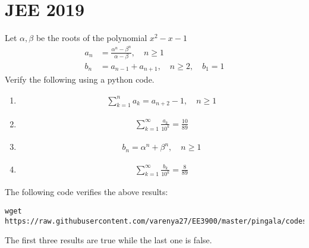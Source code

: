 \documentclass[journal,12pt,twocolumn]{IEEEtran}
\renewcommand\thesection{\arabic{section}}
\begin{document}
\section{JEE 2019}
Let $\alpha, \beta$ be the roots of the polynomial $x^2-x-1$\\
\begin{align}
	a_n &= \frac{\alpha^{n}-\beta^{n}}{\alpha - \beta}, \quad n \ge 1
	\\
	b_n &= a_{n-1} + a_{n+1}, \quad n \ge 2, \quad b_1 =1
	\label{eq:10-orig-diff}
\end{align}
Verify the following using a python code.
\begin{enumerate}[label=\thesection.\arabic*
,ref=\thesection.\theenumi]
\item 
\begin{align}
	\sum_{k=1}^{n}a_k = a_{n+2}-1, \quad n \ge 1
\end{align}
 \item 
\begin{align}
	\sum_{k=1}^{\infty}\frac{a_k}{10^k} =\frac{10}{89}
\end{align}
 \item 
\begin{align}
	b_n =\alpha^n + \beta^n, \quad n \ge 1 \label{eq:bn}
\end{align}
 \item 
\begin{align}
	\sum_{k=1}^{\infty}\frac{b_k}{10^k} =\frac{8}{89}
\end{align}
\end{enumerate}
\solution The following code verifies the above results:
	    \begin{lstlisting}
wget https://raw.githubusercontent.com/varenya27/EE3900/master/pingala/codes/1.py
\end{lstlisting}
The first three results are true while the last one is false.
\end{document}
